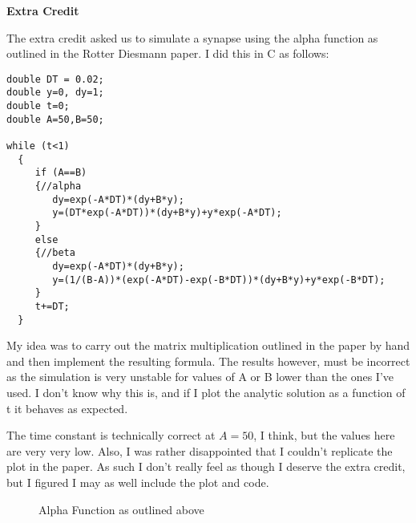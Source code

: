 \documentclass[a4paper,12pt]{article}
\begin{document}
\bigskip
\bigskip
\bigskip
\vspace{10mm}
{\bf Extra Credit}
\bigskip

The extra credit asked us to simulate a synapse using the alpha function as outlined in the Rotter Diesmann paper. I did this in C as follows:
\vspace{15mm}
\begin{verbatim}
double DT = 0.02;
double y=0, dy=1;
double t=0;
double A=50,B=50;
      
while (t<1)
  {
     if (A==B)
     {//alpha
        dy=exp(-A*DT)*(dy+B*y);
        y=(DT*exp(-A*DT))*(dy+B*y)+y*exp(-A*DT);
     }
     else
     {//beta
        dy=exp(-A*DT)*(dy+B*y);
        y=(1/(B-A))*(exp(-A*DT)-exp(-B*DT))*(dy+B*y)+y*exp(-B*DT); 
     }
     t+=DT;
  }
\end{verbatim}

My idea was to carry out the matrix multiplication outlined in the paper by hand and then implement the resulting formula. The results however, must be incorrect as the simulation is very unstable for values of A or B lower than the ones I've used. I don't know why this is, and if I plot the analytic solution as a function of t it behaves as expected. 

\vspace{2mm}

The time constant is technically correct at $A=50$, I think, but the values here are very very low. Also, I was rather disappointed that I couldn't replicate the plot in the paper. As such I don't really feel as though I deserve the extra credit, but I figured I may as well include the plot and code. 

\begin{figure}[h!]
\caption{\label{pict1}Alpha Function as outlined above}
\end{figure}
\end{document}
